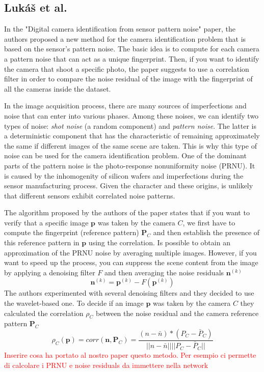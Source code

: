 \subsection{Lukáš et al.}
In the "Digital camera identification from sensor pattern noise" paper, the authors proposed a new method for the camera identification problem that is based on the sensor's pattern noise. 
The basic idea is to compute for each camera a pattern noise that can act as a unique fingerprint. Then, if you want to identify the camera that shoot a specific photo, the paper suggests to use a correlation filter in order to compare the noise residual of the image with the fingerprint of all the cameras inside the dataset.

In the image acquisition process, there are many sources of imperfections and noise that can enter into various phases. Among these noises, we can identify two types of noise: \textit{shot noise} (a random component) and \textit{pattern noise}. The latter is a deterministic component that has the characteristic of remaining approximately the same if different images of the same scene are taken. This is why this type of noise can be used for the camera identification problem. One of the dominant parts of the pattern noise is the photo-response nonuniformity noise (PRNU). It is caused by the inhomogenity of silicon wafers and imperfections during the sensor manufacturing process. Given the character and these origins, is unlikely that different sensors exhibit correlated noise patterns.

The algorithm proposed by the authors of the paper states that if you want to verify that a specific image $\boldsymbol{p}$ was taken by the camera $C$, we first have to compute the fingerprint (reference pattern) $\boldsymbol{P}_C$ and then establish the presence of this reference pattern in $\boldsymbol{p}$ using the correlation. Is possible to obtain an approximation of the PRNU noise by averaging multiple images. However, if you want to speed up the process, you can suppress the scene content from the image by applying a denoising filter $F$ and then averaging the noise residuals $\boldsymbol{n}^{(k)}$
	\[ \boldsymbol{n}^{(k)} = \boldsymbol{p}^{(k)} -  F(\boldsymbol{p}^{(k)})\]
The authors experimented with several denoising filters and they decided to use the wavelet-based one. 
To decide if an image $\boldsymbol{p}$ was taken by the camera $C$ they calculated the correlation $\rho_C$ between the noise residual and the camera reference pattern $\boldsymbol{P}_C$
\[ \rho_C(\boldsymbol{p}) = corr(\boldsymbol{n}, \boldsymbol{P}_C) = \frac{(n-\bar{n})*(P_C - \bar{P}_C)}{||n-\bar{n}||||P_C-\bar{P}_C||}	\]
\textcolor{red}{Inserire cosa ha portato al nostro paper questo metodo. Per esempio ci permette di calcolare i PRNU e noise residuals da immettere nella network}